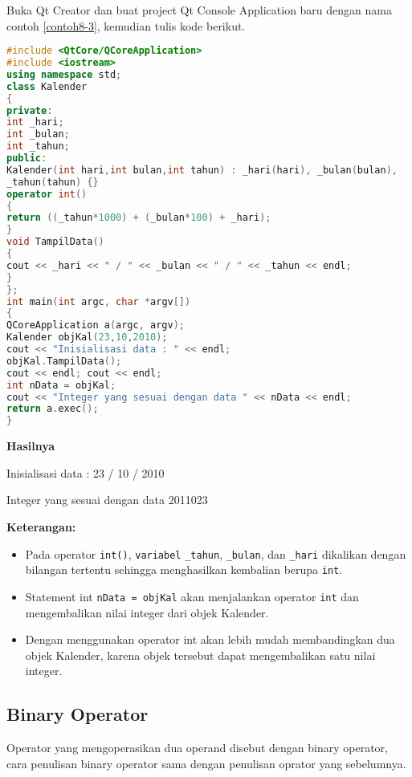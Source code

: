 Buka Qt Creator dan buat project Qt Console Application baru dengan nama
contoh \ref{contoh8-3}, kemudian tulis kode berikut.

\begin{lstlisting}[language=c++, caption=Conversion Operator untuk konversi class Kalender ke integer, label=contoh8-3]
#include <QtCore/QCoreApplication>
#include <iostream>
using namespace std;
class Kalender
{
private:
int _hari;
int _bulan;
int _tahun;
public:
Kalender(int hari,int bulan,int tahun) : _hari(hari), _bulan(bulan),
_tahun(tahun) {}
operator int()
{
return ((_tahun*1000) + (_bulan*100) + _hari);
}
void TampilData()
{
cout << _hari << " / " << _bulan << " / " << _tahun << endl;
}
};
int main(int argc, char *argv[])
{
QCoreApplication a(argc, argv);
Kalender objKal(23,10,2010);
cout << "Inisialisasi data : " << endl;
objKal.TampilData();
cout << endl; cout << endl;
int nData = objKal;
cout << "Integer yang sesuai dengan data " << nData << endl;
return a.exec();
}
\end{lstlisting}

\textbf{Hasilnya}
\begin{lcverbatim}
Inisialisasi data :
23 / 10 / 2010

Integer yang sesuai dengan data 2011023
\end{lcverbatim}


\textbf{Keterangan:}

\begin{itemize}

\item
  Pada operator \texttt{int()}, \texttt{variabel} \texttt{\_tahun},
  \texttt{\_bulan}, dan \texttt{\_hari} dikalikan dengan bilangan
  tertentu sehingga menghasilkan kembalian berupa \texttt{int}.
\item
  Statement int \texttt{nData\ =\ objKal} akan menjalankan operator
  \texttt{int} dan mengembalikan nilai integer dari objek Kalender.
\item
  Dengan menggunakan operator int akan lebih mudah membandingkan dua
  objek Kalender, karena objek tersebut dapat mengembalikan satu nilai
  integer.
\end{itemize}

\subsection{Binary Operator}\label{binary-operator}

Operator yang mengoperasikan dua operand disebut dengan binary operator,
cara penulisan binary operator sama dengan penulisan oprator yang
sebelumnya.

